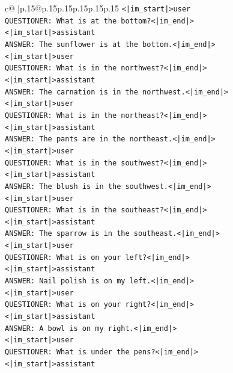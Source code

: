 \documentclass{article}
\begin{document}
{\begin{supertabular}{c@{$\;$}|p{.15\linewidth}@{}p{.15\linewidth}p{.15\linewidth}p{.15\linewidth}p{.15\linewidth}p{.15\linewidth}}
{{{\texttt{<|im\_start|>user} \\
\texttt{QUESTIONER: What is at the bottom?<|im\_end|>} \\
\texttt{<|im\_start|>assistant} \\
\texttt{ANSWER: The sunflower is at the bottom.<|im\_end|>} \\
\texttt{<|im\_start|>user} \\
\texttt{QUESTIONER: What is in the northwest?<|im\_end|>} \\
\texttt{<|im\_start|>assistant} \\
\texttt{ANSWER: The carnation is in the northwest.<|im\_end|>} \\
\texttt{<|im\_start|>user} \\
\texttt{QUESTIONER: What is in the northeast?<|im\_end|>} \\
\texttt{<|im\_start|>assistant} \\
\texttt{ANSWER: The pants are in the northeast.<|im\_end|>} \\
\texttt{<|im\_start|>user} \\
\texttt{QUESTIONER: What is in the southwest?<|im\_end|>} \\
\texttt{<|im\_start|>assistant} \\
\texttt{ANSWER: The blush is in the southwest.<|im\_end|>} \\
\texttt{<|im\_start|>user} \\
\texttt{QUESTIONER: What is in the southeast?<|im\_end|>} \\
\texttt{<|im\_start|>assistant} \\
\texttt{ANSWER: The sparrow is in the southeast.<|im\_end|>} \\
\texttt{<|im\_start|>user} \\
\texttt{QUESTIONER: What is on your left?<|im\_end|>} \\
\texttt{<|im\_start|>assistant} \\
\texttt{ANSWER: Nail polish is on my left.<|im\_end|>} \\
\texttt{<|im\_start|>user} \\
\texttt{QUESTIONER: What is on your right?<|im\_end|>} \\
\texttt{<|im\_start|>assistant} \\
\texttt{ANSWER: A bowl is on my right.<|im\_end|>} \\
\texttt{<|im\_start|>user} \\
\texttt{QUESTIONER: What is under the pens?<|im\_end|>} \\
\texttt{<|im\_start|>assistant} \\
}}}
\end{supertabular}}
\end{document}
